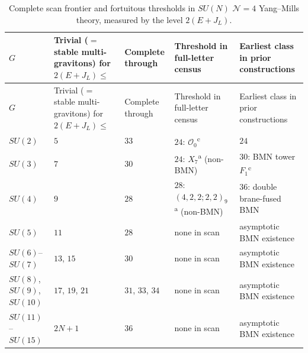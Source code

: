\documentclass[11pt]{article}
\numberwithin{equation}{section}
\numberwithin{figure}{section}
\numberwithin{table}{section}
\begin{document}
{\footnotesize\renewcommand{\arraystretch}{1.26}\setlength{\tabcolsep}{4pt}
\begin{xltabular}{\linewidth}{|l|>{\centering\arraybackslash}p{2.75cm}|>{\centering\arraybackslash}p{1.85cm}|>{\raggedright\arraybackslash}X|>{\raggedright\arraybackslash}X|}
\caption{Complete scan frontier and fortuitous thresholds in $SU(N)$ $\mathcal N=4$ Yang--Mills theory, measured by the level $2(E+J_L)$.}\label{tab-su-frontier}\\
\hline
$G$ & Trivial ($=$ stable multi-gravitons) for $2(E+J_L)\le$ & Complete through & Threshold in full-letter census & Earliest class in prior constructions\\
\hline\endfirsthead
\hline
$G$ & Trivial ($=$ stable multi-gravitons) for $2(E+J_L)\le$ & Complete through & Threshold in full-letter census & Earliest class in prior constructions\\
\hline\endhead
$SU(2)$ & $5$ & $33$ & $24$: $\mathcal O_0$\textsuperscript{c} & $24$ \cite{ChangLinWords,microstates}\\
\hline
$SU(3)$ & $7$ & $30$ & $24$: $X_7$\textsuperscript{a} (non-BMN) & $30$: BMN tower $F_1$\textsuperscript{c} \cite{CCKLL,KLLS,BraneFused}\\
\hline
$SU(4)$ & $9$ & $28$ & $28$: $(4,2,2;2,2)_9$\textsuperscript{a} (non-BMN) & $36$: double brane-fused BMN \cite[Section 4.3]{KLLS}\\
\hline
$SU(5)$ & $11$ & $28$ & none in scan & asymptotic BMN existence \cite{EveryN}\\
\hline
$SU(6)$--$SU(7)$ & $13$, $15$ & $30$ & none in scan & asymptotic BMN existence \cite{EveryN}\\
\hline
$SU(8)$, $SU(9)$, $SU(10)$ & $17$, $19$, $21$ & $31$, $33$, $34$ & none in scan & asymptotic BMN existence \cite{EveryN}\\
\hline
$SU(11)$--$SU(15)$ & $2N+1$ & $36$ & none in scan & asymptotic BMN existence \cite{EveryN}\\
\hline
\end{xltabular}}
\end{document}
